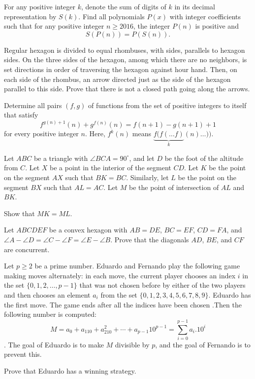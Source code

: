 \documentclass[11pt]{scrartcl}
\begin{document}
\begin{problem}[895654249061658]
	For any positive integer $k$, denote the sum of digits of $k$ in its decimal representation by $S(k)$. Find all polynomials $P(x)$ with integer coefficients such that for any positive integer $n \geq 2016$, the integer $P(n)$ is positive and$$S(P(n)) = P(S(n)).$$
\end{problem}
\begin{problem}[6576585943791349484]
Regular hexagon is divided to equal rhombuses, with sides, parallels to hexagon sides. On the three sides of the hexagon, among which there are no neighbors, is set directions in order of traversing the hexagon against hour hand. Then, on each side of the rhombus, an arrow directed just as the side of the hexagon parallel to this side. Prove that there is not a closed path going along the arrows.
\end{problem}
\begin{problem}[8493928466779199543]
	Determine all pairs $(f,g)$ of functions from the set of positive integers to itself that satisfy\[f^{g(n)+1}(n) + g^{f(n)}(n) = f(n+1) - g(n+1) + 1\]for every positive integer $n$. Here, $f^k(n)$ means $\underbrace{f(f(\ldots f)}_{k}(n) \ldots ))$.
\end{problem}
\begin{problem}[88510326676078]
	Let $ABC$ be a triangle with $\angle BCA=90^{\circ}$, and let $D$ be the foot of the altitude from $C$. Let $X$ be a point in the interior of the segment $CD$. Let $K$ be the point on the segment $AX$ such that $BK=BC$. Similarly, let $L$ be the point on the segment $BX$ such that $AL=AC$. Let $M$ be the point of intersection of $AL$ and $BK$.

Show that $MK=ML$.
\end{problem}
\begin{problem}[447212157564770]
	Let $ABCDEF$ be a convex hexagon with $AB=DE$, $BC=EF$, $CD=FA$, and $\angle A-\angle D = \angle C -\angle F = \angle E -\angle B$. Prove that the diagonals $AD$, $BE$, and $CF$ are concurrent.
\end{problem}
\begin{problem}[723726912323207]
Let $ p \geq 2$ be a prime number. Eduardo and Fernando play the following game making moves alternately: in each move, the current player chooses an index $i$ in the set $\{0,1,2,\ldots, p-1 \}$ that was not chosen before by either of the two players and then chooses an element $a_i$ from the set $\{0,1,2,3,4,5,6,7,8,9\}$. Eduardo has the first move. The game ends after all the indices have been chosen .Then the following number is computed:
$$M=a_0+a_110+a_210^2+\cdots+a_{p-1}10^{p-1}= \sum_{i=0}^{p-1}a_i.10^i$$.
The goal of Eduardo is to make $M$ divisible by $p$, and the goal of Fernando is to prevent this.

Prove that Eduardo has a winning strategy.
\end{problem}
\end{document}
